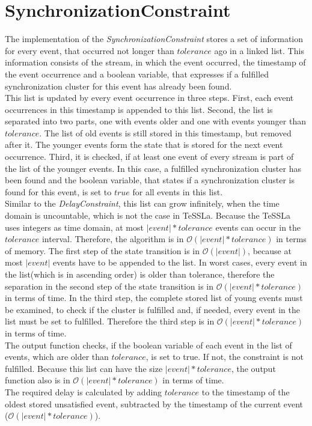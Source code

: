 \section{SynchronizationConstraint}
	The implementation of the \emph{SynchronizationConstraint} stores a set of information for every event, that occurred not longer than $tolerance$ ago in a linked list. This information consists of the stream, in which the event occurred, the timestamp of the event occurrence and a boolean variable, that expresses if a fulfilled synchronization cluster for this event has already been found.\\
	This list is updated by every event occurrence in three steps. First, each event occurrences in this timestamp is appended to this list. Second, the list is separated into two parts, one with events older and one with events younger than $tolerance$. The list of old events is still stored in this timestamp, but removed after it. The younger events form the state that is stored for the next event occurrence. Third, it is checked, if at least one event of every stream is part of the list of the younger events. In this case, a fulfilled synchronization cluster has been found and the boolean variable, that states if a synchronization cluster is found for this event, is set to $true$ for all events in this list.\\
	Similar to the \emph{DelayConstraint}, this list can grow infinitely, when the time domain is uncountable, which is not the case in TeSSLa. Because the TeSSLa uses integers as time domain, at most $|event|*tolerance$ events can occur in the $tolerance$ interval. Therefore, the algorithm is in $\mathcal{O}(|event|*tolerance)$ in terms of memory. The first step of the state transition is in $\mathcal{O}(|event|)$, because at most $|event|$ events have to be appended to the list. In worst cases, every event in the list(which is in ascending order) is older than tolerance, therefore the separation in the second step of the state transition is in $\mathcal{O}(|event|*tolerance)$ in terms of time. In the third step, the complete stored list of young events must be examined, to check if the cluster is fulfilled and, if needed, every event in the list must be set to fulfilled. Therefore the third step is in $\mathcal{O}(|event|*tolerance)$ in terms of time.\\
	The output function checks, if the boolean variable of each event in the list of events, which are older than $tolerance$, is set to true. If not, the constraint is not fulfilled. Because this list can have the size $|event|*tolerance$, the output function also is in $\mathcal{O}(|event|*tolerance)$ in terms of time.\\
	The required delay is calculated by adding $tolerance$ to the timestamp of the oldest stored unsatisfied event, subtracted by the timestamp of the current event ($\mathcal{O}(|event|*tolerance)$). 
	
